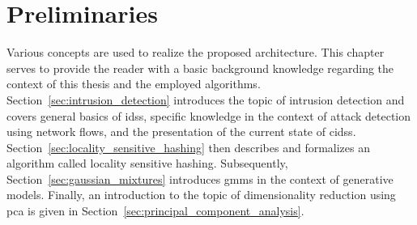 \documentclass[../../main.tex]{subfiles}
\begin{document}
\chapter{Preliminaries}\label{ch:preliminaries}

Various concepts are used to realize the proposed architecture. This chapter serves to provide the reader with a basic background knowledge regarding the context of this thesis and the employed algorithms. Section~\ref{sec:intrusion_detection} introduces the topic of intrusion detection and covers general basics of \glspl{ids}, specific knowledge in the context of attack detection using network flows, and the presentation of the current state of \glspl{cids}. Section~\ref{sec:locality_sensitive_hashing} then describes and formalizes an algorithm called locality sensitive hashing. Subsequently, Section~\ref{sec:gaussian_mixtures} introduces \glspl{gmm} in the context of generative models. Finally, an introduction to the topic of dimensionality reduction using \gls{pca} is given in Section~\ref{sec:principal_component_analysis}.

\newpage




\end{document}
